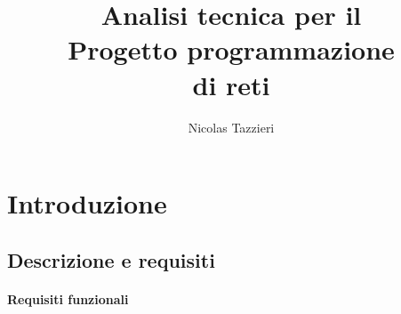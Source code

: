\documentclass[a4paper,12pt]{report}
\title{\Huge \textbf{Analisi tecnica per il \\ Progetto programmazione \\ di reti}}
\author{
    Nicolas Tazzieri
}
\begin{document}
\maketitle

\newpage

\tableofcontents

\chapter{Introduzione}

\section{Descrizione e requisiti}

\subsubsection{Requisiti funzionali}
\end{document}
